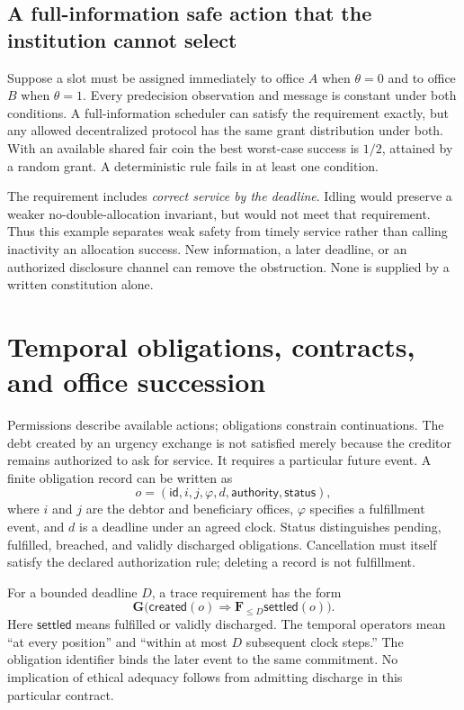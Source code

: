 \documentclass[11pt,letterpaper]{article}
\theoremstyle{plain}
\theoremstyle{definition}
\theoremstyle{remark}
\begin{document}
\subsection{A full-information safe action that the institution cannot select}
Suppose a slot must be assigned immediately to office $A$ when $\theta=0$ and to office $B$ when $\theta=1$. Every predecision observation and message is constant under both conditions. A full-information scheduler can satisfy the requirement exactly, but any allowed decentralized protocol has the same grant distribution under both. With an available shared fair coin the best worst-case success is $1/2$, attained by a random grant. A deterministic rule fails in at least one condition.

The requirement includes \emph{correct service by the deadline}. Idling would preserve a weaker no-double-allocation invariant, but would not meet that requirement. Thus this example separates weak safety from timely service rather than calling inactivity an allocation success. New information, a later deadline, or an authorized disclosure channel can remove the obstruction. None is supplied by a written constitution alone.


\section{Temporal obligations, contracts, and office succession}\label{sec:obligations}
Permissions describe available actions; obligations constrain continuations. The debt created by an urgency exchange is not satisfied merely because the creditor remains authorized to ask for service. It requires a particular future event. A finite obligation record can be written as
\[
o=(\mathsf{id},i,j,\varphi,d,\mathsf{authority},\mathsf{status}),
\]
where $i$ and $j$ are the debtor and beneficiary offices, $\varphi$ specifies a fulfillment event, and $d$ is a deadline under an agreed clock. Status distinguishes pending, fulfilled, breached, and validly discharged obligations. Cancellation must itself satisfy the declared authorization rule; deleting a record is not fulfillment.

For a bounded deadline $D$, a trace requirement has the form
\[
\mathbf G\bigl(\mathsf{created}(o)\Rightarrow
\mathbf F_{\leq D}\mathsf{settled}(o)\bigr).
\]
Here $\mathsf{settled}$ means fulfilled or validly discharged. The temporal operators mean ``at every position'' and ``within at most $D$ subsequent clock steps.'' The obligation identifier binds the later event to the same commitment. No implication of ethical adequacy follows from admitting discharge in this particular contract.
\end{document}
